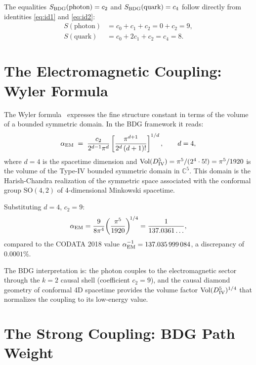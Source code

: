 \documentclass[12pt,a4paper]{article}
\theoremstyle{definition}
\begin{document}
The equalities $S_{\rm BDG}(\text{photon}) = c_2$ and
$S_{\rm BDG}(\text{quark}) = c_4$ follow directly from identities
\eqref{eq:id1} and \eqref{eq:id2}:
\begin{align}
  S(\text{photon}) &= c_0 + c_1 + c_2 = 0 + c_2 = 9, \\
  S(\text{quark})  &= c_0 + 2c_1 + c_2 = c_4 = 8.
\end{align}

\section{The Electromagnetic Coupling: Wyler Formula}
\label{sec:em}

The Wyler formula~\cite{Wyler1969} expresses the fine structure constant
in terms of the volume of a bounded symmetric domain.  In the BDG
framework it reads:
\begin{equation}
  \label{eq:wyler}
  \alpha_{\rm EM}
  \;=\; \frac{c_2}{2^{d-1}\pi^d}
  \left[\frac{\pi^{d+1}}{2^d\,(d+1)!}\right]^{1/d},
  \qquad d = 4,
\end{equation}
where $d=4$ is the spacetime dimension and
$\mathrm{Vol}(D_{\rm IV}^5) = \pi^5/(2^4\cdot 5!) = \pi^5/1920$ is
the volume of the Type-IV bounded symmetric domain in $\mathbb{C}^5$.
This domain is the Harish-Chandra realization of the symmetric space
associated with the conformal group $\mathrm{SO}(4,2)$ of 4-dimensional
Minkowski spacetime.

Substituting $d=4$, $c_2 = 9$:
\begin{equation}
  \alpha_{\rm EM}
  = \frac{9}{8\pi^4}
    \!\left(\frac{\pi^5}{1920}\right)^{\!1/4}
  = \frac{1}{137.0361\ldots},
\end{equation}
compared to the CODATA 2018 value $\alpha_{\rm EM}^{-1} = 137.035\,999\,084$,
a discrepancy of $0.0001\%$.

The BDG interpretation is: the photon couples to the electromagnetic
sector through the $k=2$ causal shell (coefficient $c_2=9$), and the
causal diamond geometry of conformal 4D spacetime provides the volume
factor $\mathrm{Vol}(D_{\rm IV}^5)^{1/4}$ that normalizes the coupling
to its low-energy value.

\section{The Strong Coupling: BDG Path Weight}
\label{sec:strong}
\end{document}
